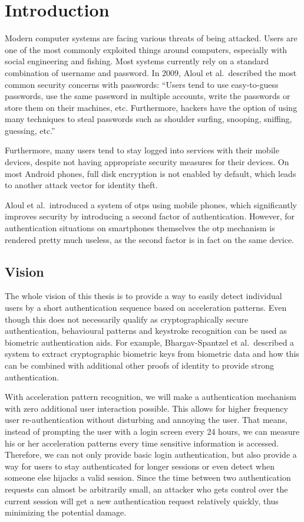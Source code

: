 \chapter{Introduction}\label{chapter:introduction}
Modern computer systems are facing various threats of being attacked. Users are one of the most commonly exploited things around computers, especially with social engineering and fishing. Most systems currently rely on a standard combination of username and password. In 2009, Aloul et al.\ described the most common security concerns with passwords:\cite{aloul2009two}
``Users tend to use easy-to-guess passwords, use the same password in multiple accounts, write the passwords or store them on their machines, etc. Furthermore, hackers have the option of using many techniques to steal passwords such as shoulder surfing, snooping, sniffing, guessing, etc.''

Furthermore, many users tend to stay logged into services with their mobile devices, despite not having appropriate security measures for their devices. On most Android phones, full disk encryption is not enabled by default, which leads to another attack vector for identity theft.

Aloul et al.\ introduced a system of \glspl{otp} using mobile phones, which significantly improves security by introducing a second factor of authentication. However, for authentication situations on smartphones themselves the \gls{otp} mechanism is rendered pretty much useless, as the second factor is in fact on the same device.

\section{Vision}
The whole vision of this thesis is to provide a way to easily detect individual users by a short authentication sequence based on acceleration patterns. Even though this does not necessarily qualify as cryptographically secure authentication, behavioural patterns and keystroke recognition can be used as biometric authentication aids. For example, Bhargav-Spantzel et al.\cite{bhargav2006privacy}\ described a system to extract cryptographic biometric keys from biometric data and how this can be combined with additional other proofs of identity to provide strong authentication.

With acceleration pattern recognition, we will make a authentication mechanism with zero additional user interaction possible. This allows for higher frequency user re-authentication without disturbing and annoying the user. That means, instead of prompting the user with a login screen every 24 hours, we can measure his or her acceleration patterns every time sensitive information is accessed. Therefore, we can not only provide basic login authentication, but also provide a way for users to stay authenticated for longer sessions or even detect when someone else hijacks a valid session. Since the time between two authentication requests can almost be arbitrarily small, an attacker who gets control over the current session will get a new authentication request relatively quickly, thus minimizing the potential damage.
